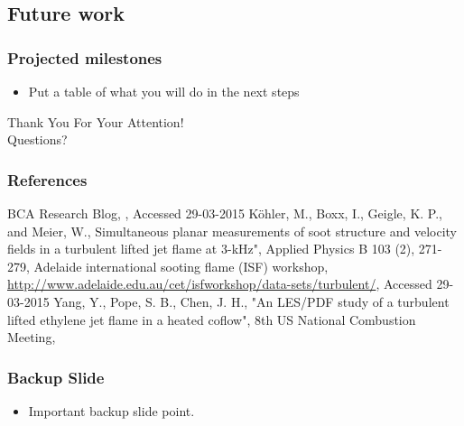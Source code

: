 \documentclass{beamer}
\begin{document}
\subsection[Future]{Future work}
\begin{frame}%
\frametitle{Projected milestones}
\scriptsize
\begin{itemize}
\item Put a table of what you will do in the next steps
\end{itemize}
\end{frame}

\begin{frame}
\begin{center}
{\huge Thank You For Your Attention!} \\
\vspace*{1.5cm}
{\Large Questions?}
\end{center}
\end{frame}

\appendix
{}
\setcounter{finalframe}{\value{framenumber}}

\begin{frame}[allowframebreaks] 
\frametitle{References}
\begin{thebibliography}{1} %
\begin{tiny}
\beamertemplatetextbibitems
{}
BCA Research Blog, , \newblock Accessed 29-03-2015
K{\"o}hler, M., Boxx, I., Geigle, K. P., and Meier, W., \newblock Simultaneous planar measurements of soot structure and velocity fields in a turbulent lifted jet flame at 3-kHz", \newblock Applied Physics B 103 (2), 271-279,   
Adelaide international sooting flame (ISF) workshop, \newblock \url{http://www.adelaide.edu.au/cet/isfworkshop/data-sets/turbulent/}, \newblock Accessed 29-03-2015
Yang, Y., Pope, S. B., Chen, J. H., \newblock "An LES/PDF study of a turbulent lifted ethylene jet flame in a heated coflow", \newblock 8th US National Combustion Meeting, 



\end{tiny}
\end{thebibliography}
\end{frame}


\begin{frame}
\frametitle{Backup Slide}

\begin{itemize}
\item Important backup slide point.
\end{itemize}

\end{frame}

\setcounter{framenumber}{\value{finalframe}}
\end{document}
